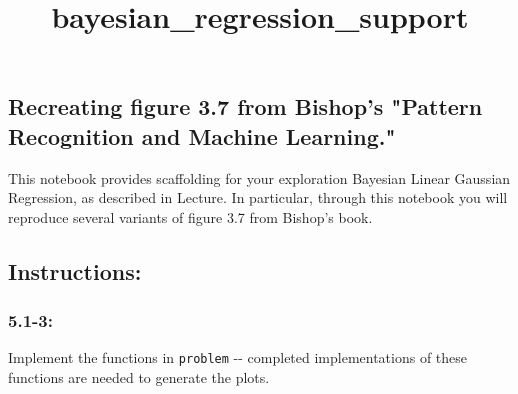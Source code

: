 \documentclass[11pt]{article}
\title{bayesian\_regression\_support}
\begin{document}
    
    
    \maketitle
    
    

    
    \subsection{Recreating figure 3.7 from Bishop's "Pattern Recognition and
Machine
Learning."}\label{recreating-figure-3.7-from-bishops-pattern-recognition-and-machine-learning.}

This notebook provides scaffolding for your exploration Bayesian Linear
Gaussian Regression, as described in Lecture. In particular, through
this notebook you will reproduce several variants of figure 3.7 from
Bishop's book.

    \subsection{Instructions:}\label{instructions}

\subsubsection{5.1-3:}\label{section}

Implement the functions in \texttt{problem} -\/- completed
implementations of these functions are needed to generate the plots.
\end{document}
